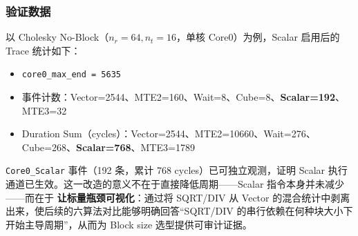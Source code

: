 \documentclass{CjC}
\begin{document}
\subsubsection{验证数据}

以 Cholesky No-Block（$n_r=64,n_t=16$，单核 Core0）为例，Scalar 启用后的 Trace 统计如下：

\begin{itemize}
    \item \texttt{core0\_max\_end = 5635}
    \item 事件计数：Vector=2544、MTE2=160、Wait=8、Cube=8、\textbf{Scalar=192}、MTE3=32
    \item Duration Sum（cycles）：Vector=2544、MTE2=10660、Wait=276、Cube=268、\textbf{Scalar=768}、MTE3=1789
\end{itemize}

\texttt{Core0\_Scalar} 事件（192 条，累计 768 cycles）已可独立观测，证明 Scalar 执行通道已生效。这一改造的意义不在于直接降低周期——Scalar 指令本身并未减少——而在于 \textbf{让标量瓶颈可视化}：通过将 SQRT/DIV 从 Vector 的混合统计中剥离出来，使后续的六算法对比能够明确回答“SQRT/DIV 的串行依赖在何种块大小下开始主导周期”，从而为 Block size 选型提供可审计证据。

\printbibliography[title={参考文献}] %
\end{document}
